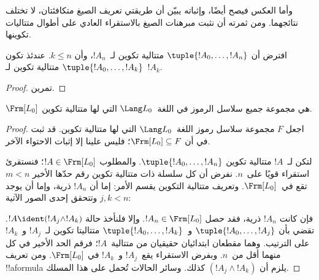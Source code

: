 \documentclass[../../../include/open-logic-section]{subfiles}
\begin{document}
وأما العكس فيصح أيضًا، وإثباته يبيّن أن طريقتي تعريف الصيغ متكافئتان، لا تختلف نتائجهما. ومن ثمرته أن نثبت مبرهنات الصيغ بالاستقراء العادي على أطوال متتاليات تكوينها.

\begin{lem}
افترض أن $\tuple{!A_0,\dotsc,!A_n}$ متتالية تكوين لـ~$!A_n$، وأن
$k \leq n$. عندئذ تكون $\tuple{!A_0,\dotsc,!A_k}$ متتالية تكوين
لـ~$!A_k$.
\end{lem}

\begin{proof}
تمرين.
\end{proof}

\begin{thm}
$\Frm[L_0]$ هي مجموعة جميع سلاسل الرموز في اللغة~$\Lang L_0$ التي
لها متتالية تكوين.
\end{thm}

\begin{proof}
اجعل $F$ مجموعة سلاسل رموز اللغة~$\Lang L_0$ التي لها متتالية تكوين.
قد ثبت في  أن
$\Frm[L_0] \subseteq F$؛ فليس علينا إلا إثبات الاحتواء الآخر.

لتكن لـ~$!A$ متتالية تكوين $\tuple{!A_0,\dotsc,!A_n}$.
والمطلوب $!A \in \Frm[L_0]$؛ فنستقرئ استقراء قويًا على~$n$.
نفرض أن كل سلسلة ذات متتالية تكوين رقم حدّها الأخير
$m < n$ تقع في~$\Frm[L_0]$. وتعريف متتالية التكوين يقسم الأمر: إما أن $!A_n$ ذرية، وإما أن يوجد $j,k < n$ وتتحقق إحدى الصور الآتية:
\begin{enumerate}
\end{enumerate}
فإن كانت $!A_n$ ذرية، فقد حصل
$!A_n \in \Frm[L_0]$. وإلا فلنأخذ حالة $!A \ident
(!A_j \land !A_k)$. تقضي  بأن
$\tuple{!A_0,\dotsc,!A_j}$ و~$\tuple{!A_0,\dotsc,!A_k}$ متتاليتا تكوين لـ~$!A_j$ و~$!A_k$ على الترتيب. وهما مقطعان ابتدائيان حقيقيان من متتالية~$!A$؛ فرقم الحد الأخير في كل منهما أقل من~$n$. وبفرض الاستقراء يقع~$!A_j$ و~$!A_k$ في
$\Frm[L_0]$. ومن تعريف !!a{formula} يلزم أن
$(!A_j \land !A_k)$ كذلك. وسائر الحالات تُحمل على هذا المسلك.
\end{proof}
\end{document}
